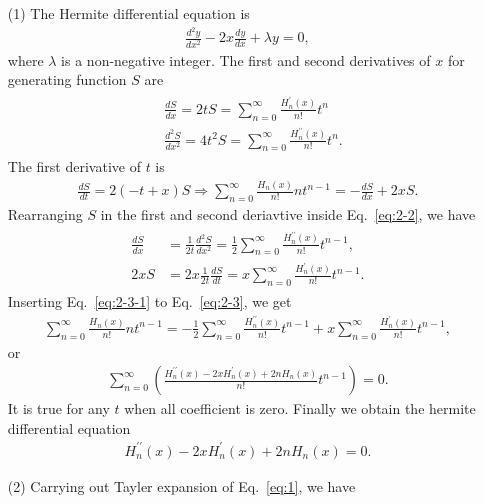 \documentclass[floatfix,nofootinbib,superscriptaddress,fleqn]{revtex4-2}
\begin{document}
\begin{itemize}
\item[(1)] The Hermite differential equation is
\begin{align}\label{eq:2-1}
  \frac{d^2y}{dx^2}-2x\frac{dy}{dx}+\lambda y = 0,
\end{align}
where $\lambda$ is a non-negative integer. 
The first and second derivatives of $x$ for generating function $S$ are
\begin{align}\label{eq:2-2}
  \begin{split}
    &\frac{dS}{dx} = 2tS = \sum^\infty_{n=0}
    \frac{H^\prime_n(x)}{n!}t^n  \\
    &\frac{d^2S}{dx^2} = 4t^2S=\sum^\infty_{n=0}
    \frac{H^{\prime\prime}_n(x)}{n!}t^n.
  \end{split}
\end{align}
The first derivative of $t$ is
\begin{align}\label{eq:2-3}
  \frac{dS}{dt} = 2(-t+x)S \Longrightarrow \sum^\infty_{n=0}
  \frac{H_n(x)}{n!}nt^{n-1}
  =-\frac{dS}{dx} +2xS.
\end{align}
Rearranging $S$ in the first and second deriavtive inside Eq.~\eqref{eq:2-2}, we have
\begin{align}\label{eq:2-3-1}
  \begin{split}
    \frac{dS}{dx} &= 
    \frac{1}{2t}\frac{d^2S}{dx^2}
    =\frac{1}{2}\sum^\infty_{n=0}
    \frac{H^{\prime\prime}_n(x)}{n!}t^{n-1} , \\
    2xS &= 2x\frac{1}{2t}\frac{dS}{dt} 
    =x\sum^\infty_{n=0}\frac{H^{\prime}_n(x)}{n!}t^{n-1}.
  \end{split}
\end{align}
Inserting Eq.~\eqref{eq:2-3-1} to Eq.~\eqref{eq:2-3}, we get
\begin{align}
  \sum^\infty_{n=0}\frac{H_n(x)}{n!}nt^{n-1}
  =-\frac{1}{2}\sum^\infty_{n=0}\frac{H^{\prime\prime}_n(x)}{n!}t^{n-1}
  +x\sum^\infty_{n=0}\frac{H^{\prime}_n(x)}{n!}t^{n-1},
\end{align}
or
\begin{align}
  \sum^\infty_{n=0}\left(\frac{H^{\prime\prime}_n(x)
  -2xH^{\prime}_n(x)+2nH_n(x)}{n!}t^{n-1}\right)=0.
\end{align}
It is true for any $t$ when all coefficient is zero. Finally we obtain
the hermite differential equation
\begin{align}\label{eq:2-4}
  H^{\prime\prime}_n(x)
  -2xH^{\prime}_n(x)+2nH_n(x)=0.
\end{align}
\item[(2)] Carrying out Tayler expansion of Eq.~\eqref{eq:1}, we have

\end{itemize}
\end{document}
